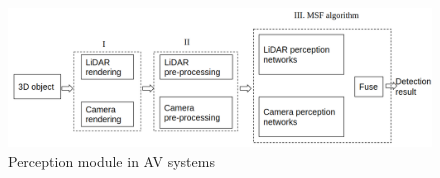 %
%
%
%
\begin{figure}
	\centering
	\includegraphics[width=0.8\linewidth]{figure/structure.png}
	\caption{Perception module in AV systems}
	\label{fig:module}
\end{figure}

